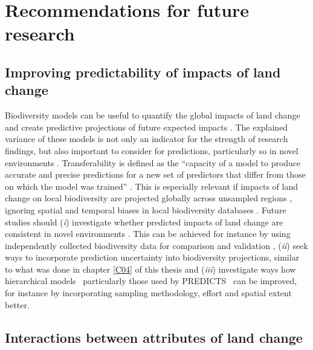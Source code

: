 \section{Recommendations for future research}
\label{C06_03}
\subsection{Improving predictability of impacts of land change}
\label{C06_0301}

Biodiversity models can be useful to quantify the global impacts of land change and create predictive projections of future expected impacts \citep{Purvis2018}. The explained variance of these models is not only an indicator for the strength of research findings, but also important to consider for predictions, particularly so in novel environments \citep{Yates2018}. Transferability is defined as the “capacity of a model to produce accurate and precise predictions for a new set of predictors that differ from those on which the model was trained” \citep{Yates2018}. This is especially relevant if impacts of land change on local biodiversity are projected globally across unsampled regions \citep{Newbold2015,Purvis2018}, ignoring spatial and temporal biases in local biodiversity databases \citep{Martin2012,Hudson2014,Gonzalez2016}. Future studies should (\textit{i}) investigate whether predicted impacts of land change are consistent in novel environments \citep{Yates2018}. This can be achieved for instance by using independently collected biodiversity data for comparison and validation \citep{Jung2016}, (\textit{ii}) seek ways to incorporate prediction uncertainty into biodiversity projections, similar to what was done in chapter \ref{C04} of this thesis and (\textit{iii}) investigate ways how hierarchical models \textendash\ particularly those used by PREDICTS \citep{Purvis2018} \textendash\ can be improved, for instance by incorporating sampling methodology, effort and spatial extent better.  

\subsection{Interactions between attributes of land change}
\label{C06_0302}

